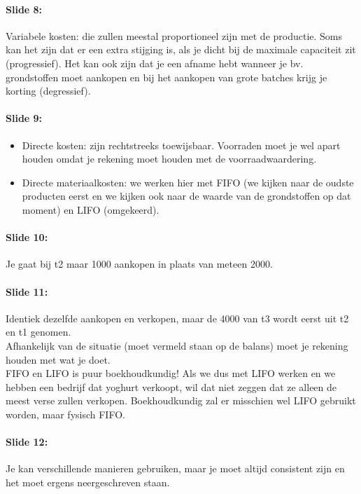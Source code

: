 \documentclass[10pt,a4paper]{report}
\begin{document}
\paragraph{Slide 8:} Variabele kosten: die zullen meestal proportioneel zijn met de productie. Soms kan het zijn dat er een extra stijging is, als je dicht bij de maximale capaciteit zit (progressief). Het kan ook zijn dat je een afname hebt wanneer je bv. grondstoffen moet aankopen en bij het aankopen van grote batches krijg je korting (degressief). 

\paragraph{Slide 9:}
\begin{itemize}
\item Directe kosten: zijn rechtstreeks toewijsbaar. Voorraden moet je wel apart houden omdat je rekening moet houden met de voorraadwaardering.
\item Directe materiaalkosten: we werken hier met FIFO (we kijken naar de oudste producten eerst en we kijken ook naar de waarde van de grondstoffen op dat moment) en LIFO (omgekeerd).
\end{itemize}

\paragraph{Slide 10:} Je gaat bij t2 maar 1000 aankopen in plaats van meteen 2000.

\paragraph{Slide 11:} Identiek dezelfde aankopen en verkopen, maar de 4000 van t3 wordt eerst uit t2 en t1 genomen.\\
Afhankelijk van de situatie (moet vermeld staan op de balans) moet je rekening houden met wat je doet.\\
FIFO en LIFO is puur boekhoudkundig! Als we dus met LIFO werken en we hebben een bedrijf dat yoghurt verkoopt, wil dat niet zeggen dat ze alleen de meest verse zullen verkopen. Boekhoudkundig zal er misschien wel LIFO gebruikt worden, maar fysisch FIFO.

\paragraph{Slide 12:} Je kan verschillende manieren gebruiken, maar je moet altijd consistent zijn en het moet ergens neergeschreven staan.
\end{document}
